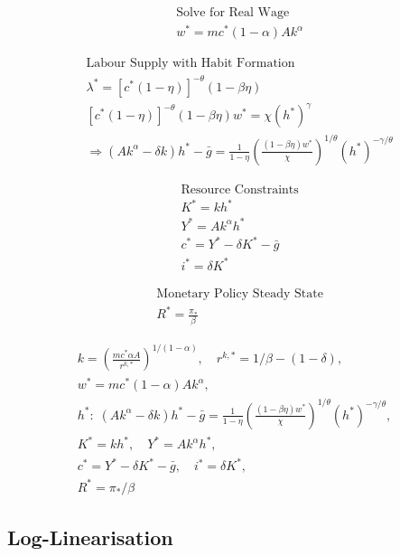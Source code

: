 \documentclass[11pt,preprint]{elsarticle}
\numberwithin{equation}{section}
\numberwithin{figure}{section}
\numberwithin{table}{section}
\begin{document}
\begin{align*}
& \text{Solve for Real Wage} \\
& w^* = mc^*(1-\alpha)Ak^\alpha
\end{align*}

\begin{align*}
& \text{Labour Supply with Habit Formation} \\
& \lambda^* = [c^*(1-\eta)]^{-\theta}(1 - \beta\eta) \\
& [c^*(1-\eta)]^{-\theta}(1 - \beta\eta)w^* = \chi(h^*)^\gamma \\[6pt]
& \Rightarrow (Ak^\alpha - \delta k)h^* - \bar{g}
= \frac{1}{1-\eta}\left(\frac{(1-\beta\eta)w^*}{\chi}\right)^{\!1/\theta}(h^*)^{-\gamma/\theta}
\end{align*}

\begin{align*}
& \text{Resource Constraints} \\
& K^* = kh^* \\
& Y^* = Ak^\alpha h^* \\
& c^* = Y^* - \delta K^* - \bar{g} \\
& i^* = \delta K^*
\end{align*}

\begin{align*}
& \text{Monetary Policy Steady State} \\
& R^* = \frac{\pi_*}{\beta}
\end{align*}

\begin{equation}\label{closed_form_ss}
\boxed{
  \begin{gathered}
    k = \left(\frac{mc^*\alpha A}{r^{k,*}}\right)^{\!1/(1-\alpha)}, 
    \quad
    r^{k,*} = 1/\beta - (1-\delta),
    \\[4pt]
    w^* = mc^*(1-\alpha)Ak^\alpha,
    \\[4pt]
    h^*:\; (Ak^\alpha - \delta k)h^* - \bar{g}
    = \frac{1}{1-\eta}\left(\frac{(1-\beta\eta)w^*}{\chi}\right)^{\!1/\theta}(h^*)^{-\gamma/\theta},
    \\[4pt]
    K^* = kh^*, 
    \quad 
    Y^* = Ak^\alpha h^*, 
    \\[4pt]
    c^* = Y^* - \delta K^* - \bar{g}, 
    \quad 
    i^* = \delta K^*,
    \\[4pt]
    R^* = \pi_*/\beta
  \end{gathered}
}
\end{equation}

\newpage

\subsection{Log-Linearisation}\label{log-linearisation}
\end{document}
